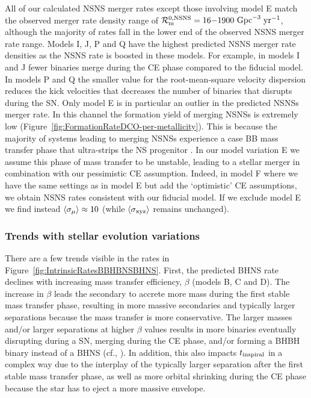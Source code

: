 \documentclass[fleqn,usenatbib]{mnras}
\newcommand\rate{\mathcal{R}}
\newcommand{\yearmin}{\ensuremath{\,\rm{yr}^{-1}}\xspace}
\newcommand{\GpcminThree}{\ensuremath{\,\rm{Gpc}^{-3}}\xspace}
\newcommand{\tinspiral}{\ensuremath{{t}_{\rm{inspiral}}}\xspace}
\newcommand{\RateGWTCmaxNSNS}{\ensuremath{1900}\xspace}
\newcommand{\RateGWTCminNSNS}{\ensuremath{16}\xspace}
\begin{document}
All of our calculated \ac{NSNS} merger rates except those involving model E match the observed merger rate density range of $\rate_{\rm{m}}^{0,\rm{NSNS}} =\RateGWTCminNSNS{-} \RateGWTCmaxNSNS$\GpcminThree\yearmin \citep{Abbott:2021GWTC3pop}, although the majority of rates fall in the lower end of the observed \ac{NSNS} merger rate range.   
Models I, J, P and Q have the highest predicted \ac{NSNS} merger rate densities as the \ac{NSNS} rate is boosted in these models. For example, in models I and J fewer binaries merge during the \ac{CE} phase compared to the fiducial model. In models P and Q the smaller value for the root-mean-square velocity dispersion reduces the kick velocities that decreases the number of binaries that disrupts during the \ac{SN}. Only model E is in particular an outlier in the predicted \acp{NSNS} merger rate. In this channel the formation yield of merging \acp{NSNS} is extremely low (Figure~\ref{fig:FormationRateDCO-per-metallicity}). This is because the majority of systems leading to merging \acp{NSNS} experience a case BB mass transfer phase that ultra-strips the NS progenitor \citep{Dewi:2003,2017ApJ...846..170T}. In our model variation E we assume this phase of mass transfer to be unstable, leading to a stellar merger in combination with our pessimistic \ac{CE} assumption. Indeed, in model F where we have the same settings as in model E but add the `optimistic' CE assumptions, we obtain \ac{NSNS} rates consistent with our fiducial model. If we exclude model E we find instead  $\langle \sigma_{\rm{\mu}}\rangle \approx 10 $ (while  $\langle \sigma_{\rm{xyz}}\rangle$ remains unchanged).





\subsubsection{Trends with stellar evolution variations}
%
There are a few trends visible in the rates in Figure~\ref{fig:IntrinsicRatesBBHBNSBHNS}. First, the predicted \ac{BHNS} rate declines with increasing mass transfer efficiency, $\beta$ (models B, C and D). The increase in $\beta$ leads the secondary to accrete more mass during the first stable mass transfer phase, resulting in more massive secondaries and typically larger separations because the mass transfer is more conservative.  
The larger masses and/or larger separations at higher $\beta$ values results in  more binaries eventually disrupting during a \ac{SN}, merging during the \ac{CE} phase, and/or forming a \ac{BHBH} binary instead of a BHNS (cf., \citealt{Kruckow:2018}). In addition, this  also impacts \tinspiral in a complex way due to the interplay of the typically larger separation after the first stable mass transfer phase, as well as more orbital shrinking during the \ac{CE} phase because the star has to eject a more massive envelope.    
\end{document}
